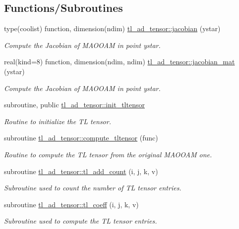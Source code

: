 \subsection*{Functions/\+Subroutines}
\begin{DoxyCompactItemize}
\item 
type(coolist) function, dimension(ndim) \hyperlink{namespacetl__ad__tensor_af4dbec99377125d7df10d89524ba91b2}{tl\+\_\+ad\+\_\+tensor\+::jacobian} (ystar)
\begin{DoxyCompactList}\small\item\em Compute the Jacobian of M\+A\+O\+O\+AM in point ystar. \end{DoxyCompactList}\item 
real(kind=8) function, dimension(ndim, ndim) \hyperlink{namespacetl__ad__tensor_a19ab832f709efc3719eb272313462971}{tl\+\_\+ad\+\_\+tensor\+::jacobian\+\_\+mat} (ystar)
\begin{DoxyCompactList}\small\item\em Compute the Jacobian of M\+A\+O\+O\+AM in point ystar. \end{DoxyCompactList}\item 
subroutine, public \hyperlink{namespacetl__ad__tensor_a8a94fe84e907fc8835f798eddcff38e8}{tl\+\_\+ad\+\_\+tensor\+::init\+\_\+tltensor}
\begin{DoxyCompactList}\small\item\em Routine to initialize the TL tensor. \end{DoxyCompactList}\item 
subroutine \hyperlink{namespacetl__ad__tensor_a8b1027b49025fbeacd8fbd5d2127bebc}{tl\+\_\+ad\+\_\+tensor\+::compute\+\_\+tltensor} (func)
\begin{DoxyCompactList}\small\item\em Routine to compute the TL tensor from the original M\+A\+O\+O\+AM one. \end{DoxyCompactList}\item 
subroutine \hyperlink{namespacetl__ad__tensor_a3d69845cace6faef04342c297b0c2a09}{tl\+\_\+ad\+\_\+tensor\+::tl\+\_\+add\+\_\+count} (i, j, k, v)
\begin{DoxyCompactList}\small\item\em Subroutine used to count the number of TL tensor entries. \end{DoxyCompactList}\item 
subroutine \hyperlink{namespacetl__ad__tensor_a0e37e78de771af0205bd80a30c911a68}{tl\+\_\+ad\+\_\+tensor\+::tl\+\_\+coeff} (i, j, k, v)
\begin{DoxyCompactList}\small\item\em Subroutine used to compute the TL tensor entries. \end{DoxyCompactList}\item 

\end{DoxyCompactItemize}
